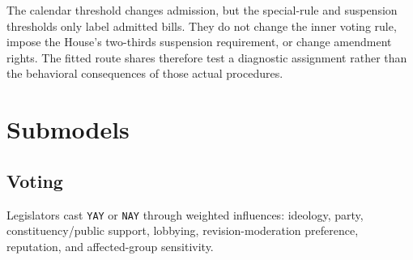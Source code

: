 \documentclass[manuscript]{acmart}
\begin{document}
The calendar threshold changes admission, but the special-rule and suspension thresholds only label admitted bills. They do not change the inner voting rule, impose the House's two-thirds suspension requirement, or change amendment rights. The fitted route shares therefore test a diagnostic assignment rather than the behavioral consequences of those actual procedures.



\section{Submodels}

\subsection{Voting}

Legislators cast \texttt{YAY} or \texttt{NAY} through weighted influences: ideology, party, constituency/public support, lobbying, revision-moderation preference, reputation, and affected-group sensitivity.

\begin{table}
  \caption{Vote-score feature functions and weights. The anti-capture kernel changes weights; affected-group variables enter procedural thresholds and metrics rather than the base yes/no vote score.}
  \label{tab:appendix-vote-features}
  \scriptsize
\end{table}
\end{document}
